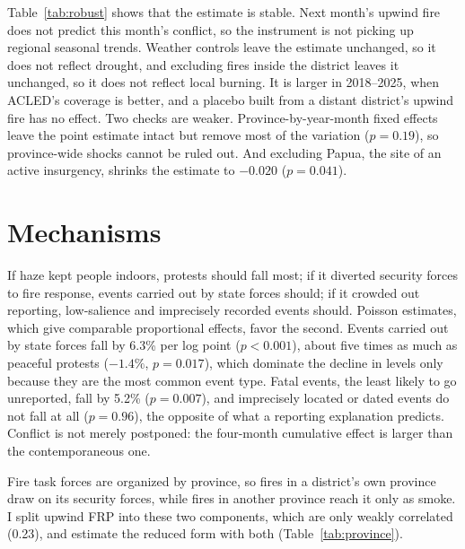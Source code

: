 \documentclass[12pt]{article}
\begin{document}
Table~\ref{tab:robust} shows that the estimate is stable. Next month's upwind fire does not predict this month's conflict, so the instrument is not picking up regional seasonal trends. Weather controls leave the estimate unchanged, so it does not reflect drought, and excluding fires inside the district leaves it unchanged, so it does not reflect local burning. It is larger in 2018--2025, when ACLED's coverage is better, and a placebo built from a distant district's upwind fire has no effect. Two checks are weaker. Province-by-year-month fixed effects leave the point estimate intact but remove most of the variation ($p=0.19$), so province-wide shocks cannot be ruled out. And excluding Papua, the site of an active insurgency, shrinks the estimate to $-0.020$ ($p=0.041$).

\section{Mechanisms}
\label{sec:mechanisms}

If haze kept people indoors, protests should fall most; if it diverted security forces to fire response, events carried out by state forces should; if it crowded out reporting, low-salience and imprecisely recorded events should. Poisson estimates, which give comparable proportional effects, favor the second. Events carried out by state forces fall by 6.3\% per log point ($p<0.001$), about five times as much as peaceful protests ($-1.4\%$, $p=0.017$), which dominate the decline in levels only because they are the most common event type. Fatal events, the least likely to go unreported, fall by 5.2\% ($p=0.007$), and imprecisely located or dated events do not fall at all ($p=0.96$), the opposite of what a reporting explanation predicts. Conflict is not merely postponed: the four-month cumulative effect is larger than the contemporaneous one.

Fire task forces are organized by province, so fires in a district's own province draw on its security forces, while fires in another province reach it only as smoke. I split upwind FRP into these two components, which are only weakly correlated (0.23), and estimate the reduced form with both (Table~\ref{tab:province}).
\end{document}
